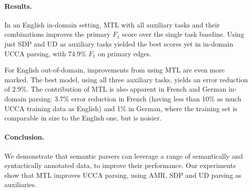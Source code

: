 \documentclass[11pt,a4paper]{article}
\begin{document}
\paragraph{Results.}
In an English in-domain setting, MTL with all auxiliary tasks and their combinations improves the primary $F_1$ score over
the single task baseline.
Using just SDP and UD as auxiliary tasks
yielded the best scores yet in in-domain UCCA parsing,
with 74.9\% $F_1$ on primary edges.

For English out-of-domain, improvements from using MTL are even more marked. 
The best model, using all three auxiliary tasks,
yields an error reduction of 2.9\%.
The contribution of MTL is also apparent in French and German in-domain parsing:
3.7\% error reduction in French
(having less than 10\% as much UCCA training data as English)
and 1\% in German, where the training set is comparable in size to the English one,
but is noisier.



\paragraph{Conclusion.}

We demonstrate that semantic parsers can leverage a range of 
semantically and syntactically annotated data, to improve their performance.
Our experiments show that MTL improves UCCA parsing,
using AMR, SDP and UD parsing as auxiliaries.





\end{document}

